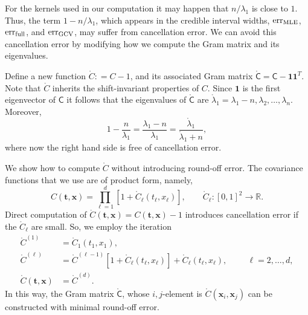 \documentclass{iitthesis}          %
\newcommand{\bm}[1]{\boldsymbol{#1}}
\newcommand{\reals}{\mathbb{R}}
\newcommand{\rC}{\mathring{C}}
\newcommand{\rlambda}{\mathring{\lambda}}
\newcommand{\vt}{\bm{t}}
\newcommand{\vx}{\bm{x}}
\newcommand{\vone}{\bm{1}}
\newcommand{\mC}{\mathsf{C}}
\newcommand{\rmC}{\mathring{\mathsf{C}}}
\newcommand{\MLE}{\textup{MLE}}
\newcommand{\err}{\textup{err}}
\begin{document}
\clearpage







\label{sec:NumImpl}

\label{sec:overcome_cancel_error}

For the kernels used in our computation it may happen that $n/\lambda_1$ is close to $1$.  Thus, the term $1-n/\lambda_1$, which appears in the credible interval widths, $\err_{\MLE}$, $\err_{\textup{full}}$, and $\err_{\textup{GCV}}$, may suffer from cancellation error.  We can avoid this cancellation error by modifying how we compute the Gram matrix and its eigenvalues.

Define a new function $\rC : = C -1$, and its associated Gram matrix $\rmC = \mC - \vone \vone^T$.   Note that $\rC$ inherits the shift-invariant properties of $C$.  Since $\vone$ is the first eigenvector of $\mC$ it follows that the eigenvalues of $\rmC$ are $\rlambda_1 = \lambda_1 - n, \lambda_2, \ldots, \lambda_n$.  Moreover,
\begin{equation*}
1 - \frac{n}{\lambda_1}  = \frac{\lambda_1 - n}{\lambda_1} = \frac{\rlambda_1}{\rlambda_1 +n},
\end{equation*}
where now the right hand side is free of cancellation error.

We show how to compute $\rC$ without introducing round-off error.  The covariance functions that we use are of product form, namely,
\begin{equation*}
C(\vt, \vx) = \prod_{\ell=1}^d \left[1 + \rC_\ell(t_\ell,x_\ell) \right], \qquad  \rC_\ell:[0,1]^2 \to \reals.
\end{equation*}
Direct computation of $\rC (\vt,\vx) = C(\vt,\vx) -1$ introduces cancellation error if the $ \rC_\ell$ are small.  So, we employ the iteration
\begin{align*}
\rC^{(1)} &= \rC_1(t_1,x_1),  \\
\rC^{(\ell)} &  = \rC^{(\ell-1)}[1 + \rC_\ell(t_\ell,x_\ell)] + \rC_\ell(t_\ell,x_\ell),  \hspace{1cm} \ell = 2, \ldots, d, \\
\rC(\vt,\vx)  & = \rC^{(d)}.
\end{align*}
In this way, the Gram matrix $\rmC$, whose $i,j$-element is $\rC(\vx_i,\vx_j)$ can be constructed with minimal round-off error.
\end{document}

